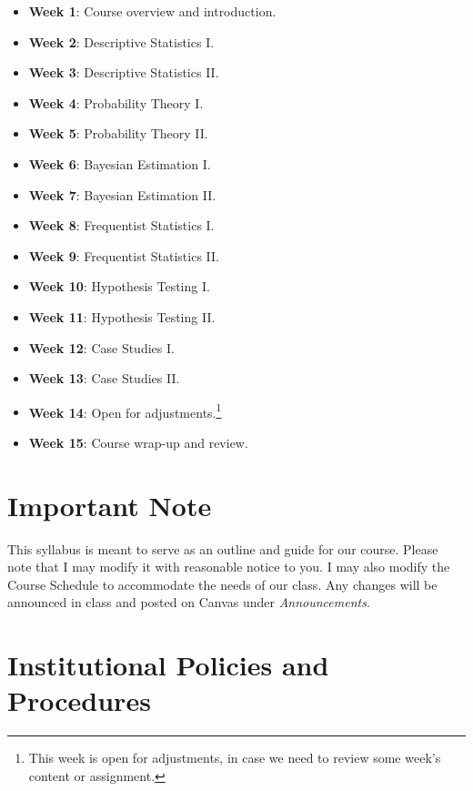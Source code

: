 \documentclass[11pt,]{article}
\begin{document}
\begin{itemize}
\item
  \textbf{Week 1}: Course overview and introduction.
\item
  \textbf{Week 2}: Descriptive Statistics I.
\item
  \textbf{Week 3}: Descriptive Statistics II.
\item
  \textbf{Week 4}: Probability Theory I.
\item
  \textbf{Week 5}: Probability Theory II.
\item
  \textbf{Week 6}: Bayesian Estimation I.
\item
  \textbf{Week 7}: Bayesian Estimation II.
\item
  \textbf{Week 8}: Frequentist Statistics I.
\item
  \textbf{Week 9}: Frequentist Statistics II.
\item
  \textbf{Week 10}: Hypothesis Testing I.
\item
  \textbf{Week 11}: Hypothesis Testing II.
\item
  \textbf{Week 12}: Case Studies I.
\item
  \textbf{Week 13}: Case Studies II.
\item
  \textbf{Week 14}: Open for adjustments.\footnote{This week is open for
    adjustments, in case we need to review some week's content or
    assignment.}
\item
  \textbf{Week 15}: Course wrap-up and review.
\end{itemize}

\vspace{1cm}

\hypertarget{important-note}{%
\section{Important Note}\label{important-note}}

\vspace{.3cm}

This syllabus is meant to serve as an outline and guide for our course.
Please note that I may modify it with reasonable notice to you. I may
also modify the Course Schedule to accommodate the needs of our class.
Any changes will be announced in class and posted on Canvas under
\emph{Announcements}.

\hypertarget{institutional-policies-and-procedures}{%
\section{Institutional Policies and
Procedures}\label{institutional-policies-and-procedures}}
\end{document}

